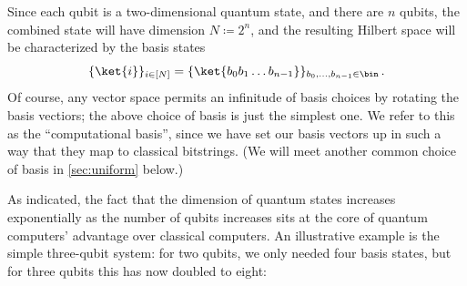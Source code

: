       Since each qubit is a two-dimensional quantum state, and there are $n$
        qubits, the
        combined state will have dimension $N \coloneqq 2^n$, and the resulting Hilbert
        space will be characterized by the basis states
      \[
        \{\ket{i}\}_{i \in [N]} = \{ \ket{b_0 b_1 \ldots b_{n-1}}
          \}_{b_0, \ldots, b_{n-1} \in \bin}\, .
      \]
      Of course, any vector space permits an infinitude of basis
        choices by rotating the basis vectiors; the above choice of basis is
        just the simplest one. We refer
        to this as the ``computational basis'', since
        we have set our basis vectors up in such a way that they map to
        classical bitstrings. (We will meet another common choice of basis
        in \cref{sec:uniform} below.)

      As indicated, the fact that the dimension of quantum states increases exponentially as
        the number of qubits increases sits at the core of quantum computers'
        advantage over classical computers. An illustrative
        example is the simple three-qubit system: for two qubits, we only needed
        four basis states, but for three qubits this has now doubled to eight:
